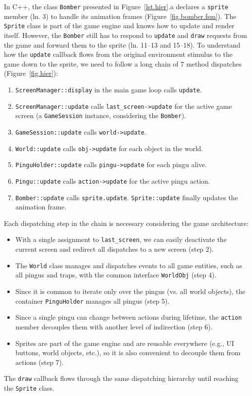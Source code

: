\documentclass{vgtc}                          %
\newcommand{\code}[1] {{\small{\texttt{#1}}}}
\begin{document}
In C++, the class \code{Bomber} presented in Figure~\ref{lst.hier}.a declares a
\code{sprite} member (ln. 3) to handle its animation frames
(Figure~\ref{fig.bomber.fsm}).
%
The \code{Sprite} class is part of the game engine and knows how to update and
render itself.
However, the \code{Bomber} still has to respond to \code{update} and
\code{draw} requests from the game and forward them to the sprite
(ln. 11--13 and 15--18).
%
To understand how the \code{update} callback flows from the original
environment stimulus to the game down to the sprite, we need to follow a long
chain of 7 method dispatches (Figure~\ref{fig.hier}):
%
\begin{enumerate}
\item \code{ScreenManager::display} in the main game loop calls \code{update}.
\item \code{ScreenManager::update} calls \code{last\_screen->update} for the
      active game screen (a \code{GameSession} instance, considering the
      \code{Bomber}).
\item \code{GameSession::update} calls \code{world->update}.
\item \code{World::update} calls \code{obj->update} for each object in the
      world.
\item \code{PinguHolder::update} calls \code{pingu->update} for each pingu
      alive.
\item \code{Pingu::update} calls \code{action->update} for the active pingu
      action.
\item \code{Bomber::update} calls \code{sprite.update}.
      \code{Sprite::update} finally updates the animation frame.
\end{enumerate}
%
Each dispatching step in the chain is necessary considering the game
architecture:
%
\begin{itemize}
\item With a single assignment to \code{last\_screen}, we can easily deactivate
      the current screen and redirect all dispatches to a new screen (step 2).
\item The \code{World} class manages and dispatches events to all game
      entities, such as all pingus and traps, with the common interface
      \code{WorldObj} (step 4).
\item Since it is common to iterate only over the pingus (vs. all world
      objects), the container \code{PinguHolder} manages all pingus (step 5).
\item Since a single pingu can change between actions during lifetime, the
      \code{action} member decouples them with another level of indirection
      (step 6).
\item Sprites are part of the game engine and are reusable everywhere (e.g., UI
      buttons, world objects, etc.), so it is also convenient to decouple them
      from actions (step 7).
\end{itemize}
%
The \code{draw} callback flows through the same dispatching hierarchy until
reaching the \code{Sprite} class.
\end{document}
